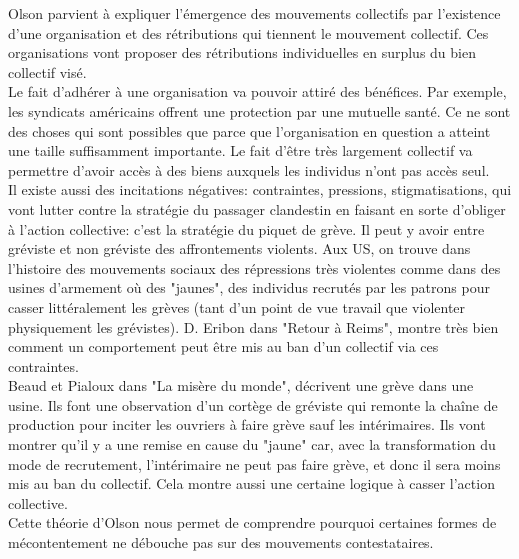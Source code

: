 \documentclass[10pt, a4paper, openany]{book}
\begin{document}
Olson parvient à expliquer l'émergence des mouvements collectifs par l'existence d'une organisation et des rétributions qui tiennent le mouvement collectif. Ces organisations vont proposer des rétributions individuelles en surplus du bien collectif visé. \\
Le fait d'adhérer à une organisation va pouvoir attiré des bénéfices. Par exemple, les syndicats américains offrent une protection par une mutuelle santé. Ce ne sont des choses qui sont possibles que parce que l'organisation en question a atteint une taille suffisamment importante. Le fait d'être très largement collectif va permettre d'avoir accès à des biens auxquels les individus n'ont pas accès seul. \\
Il existe aussi des incitations négatives: contraintes, pressions, stigmatisations, qui vont lutter contre la stratégie du passager clandestin en faisant en sorte d'obliger à l'action collective: c'est la stratégie du piquet de grève. Il peut y avoir entre gréviste et non gréviste des affrontements violents. Aux US, on trouve dans l'histoire des mouvements sociaux des répressions très violentes comme dans des usines d'armement où des "jaunes", des individus recrutés par les patrons pour casser littéralement les grèves (tant d'un point de vue travail que violenter physiquement les grévistes). D. Eribon dans "Retour à Reims", montre très bien comment un comportement peut être mis au ban d'un collectif via ces contraintes. \\
Beaud et Pialoux dans "La misère du monde", décrivent une grève dans une usine. Ils font une observation d'un cortège de gréviste qui remonte la chaîne de production pour inciter les ouvriers à faire grève sauf les intérimaires. Ils vont montrer qu'il y a une remise en cause du "jaune" car, avec la transformation du mode de recrutement, l'intérimaire ne peut pas faire grève, et donc il sera moins mis au ban du collectif. Cela montre aussi une certaine logique à casser l'action collective. \\
Cette théorie d'Olson nous permet de comprendre pourquoi certaines formes de mécontentement ne débouche pas sur des mouvements contestataires. 
\end{document}
